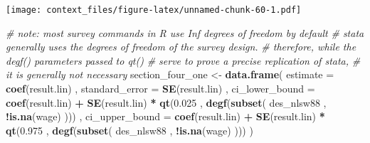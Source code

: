 \documentclass[
]{book}
\newenvironment{Shaded}{\begin{snugshade}}{\end{snugshade}}
\newcommand{\AttributeTok}[1]{\textcolor[rgb]{0.13,0.29,0.53}{#1}}
\newcommand{\CommentTok}[1]{\textcolor[rgb]{0.56,0.35,0.01}{\textit{#1}}}
\newcommand{\FloatTok}[1]{\textcolor[rgb]{0.00,0.00,0.81}{#1}}
\newcommand{\FunctionTok}[1]{\textcolor[rgb]{0.13,0.29,0.53}{\textbf{#1}}}
\newcommand{\NormalTok}[1]{#1}
\newcommand{\OtherTok}[1]{\textcolor[rgb]{0.56,0.35,0.01}{#1}}
\newcommand{\SpecialCharTok}[1]{\textcolor[rgb]{0.81,0.36,0.00}{\textbf{#1}}}
\begin{document}
\texttt{[image: context\_files/figure-latex/unnamed-chunk-60-1.pdf]}

\begin{Shaded}
\begin{Highlighting}[]
\CommentTok{\# note: most survey commands in R use Inf degrees of freedom by default}
\CommentTok{\# stata generally uses the degrees of freedom of the survey design.}
\CommentTok{\# therefore, while the degf() parameters passed to qt()}
\CommentTok{\# serve to prove a precise replication of stata,}
\CommentTok{\# it is generally not necessary}
\NormalTok{section\_four\_one }\OtherTok{\textless{}{-}}
  \FunctionTok{data.frame}\NormalTok{(}
    \AttributeTok{estimate =} \FunctionTok{coef}\NormalTok{(result.lin) ,}
    \AttributeTok{standard\_error =} \FunctionTok{SE}\NormalTok{(result.lin) ,}
    \AttributeTok{ci\_lower\_bound =}
      \FunctionTok{coef}\NormalTok{(result.lin) }\SpecialCharTok{+}
      \FunctionTok{SE}\NormalTok{(result.lin) }\SpecialCharTok{*}
      \FunctionTok{qt}\NormalTok{(}\FloatTok{0.025}\NormalTok{ , }\FunctionTok{degf}\NormalTok{(}\FunctionTok{subset}\NormalTok{(}
\NormalTok{        des\_nlsw88 , }\SpecialCharTok{!}\FunctionTok{is.na}\NormalTok{(wage)}
\NormalTok{      ))) ,}
    \AttributeTok{ci\_upper\_bound =}
      \FunctionTok{coef}\NormalTok{(result.lin) }\SpecialCharTok{+}
      \FunctionTok{SE}\NormalTok{(result.lin) }\SpecialCharTok{*}
      \FunctionTok{qt}\NormalTok{(}\FloatTok{0.975}\NormalTok{ , }\FunctionTok{degf}\NormalTok{(}\FunctionTok{subset}\NormalTok{(}
\NormalTok{        des\_nlsw88 , }\SpecialCharTok{!}\FunctionTok{is.na}\NormalTok{(wage)}
\NormalTok{      )))}
\NormalTok{  )}
\end{Highlighting}
\end{Shaded}
\end{document}
